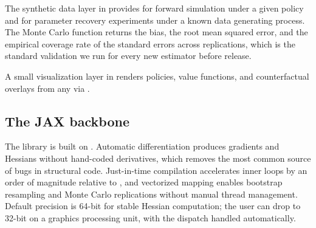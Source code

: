 The synthetic data layer in  provides  for forward simulation under a given policy and  for parameter recovery experiments under a known data generating process. The Monte Carlo function returns the bias, the root mean squared error, and the empirical coverage rate of the standard errors across replications, which is the standard validation we run for every new estimator before release.

A small visualization layer in  renders policies, value functions, and counterfactual overlays from any  via .

\subsection{The JAX backbone}

The library is built on  \citep{jax2018github}. Automatic differentiation produces gradients and Hessians without hand-coded derivatives, which removes the most common source of bugs in structural code. Just-in-time compilation accelerates inner loops by an order of magnitude relative to , and vectorized mapping enables bootstrap resampling and Monte Carlo replications without manual thread management. Default precision is 64-bit for stable Hessian computation; the user can drop to 32-bit on a graphics processing unit, with the dispatch handled automatically.

